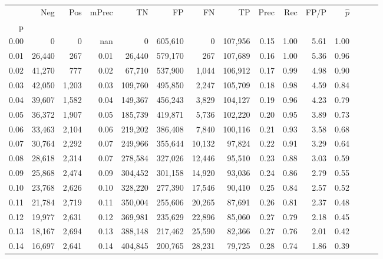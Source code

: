 \begin{tabular}{rrrrrrrrrrrrrrr}
\toprule
{} &     Neg &    Pos & mPrec &       TN &       FP &       FN &       TP &  Prec &   Rec &  FP/P & $\hat{p}$ \\
p    &         &        &       &          &          &          &          &       &       &       &           \\
\midrule
0.00 &       0 &      0 &   nan &        0 &  605,610 &        0 &  107,956 &  0.15 &  1.00 &  5.61 &      1.00 \\
0.01 &  26,440 &    267 &  0.01 &   26,440 &  579,170 &      267 &  107,689 &  0.16 &  1.00 &  5.36 &      0.96 \\
0.02 &  41,270 &    777 &  0.02 &   67,710 &  537,900 &    1,044 &  106,912 &  0.17 &  0.99 &  4.98 &      0.90 \\
0.03 &  42,050 &  1,203 &  0.03 &  109,760 &  495,850 &    2,247 &  105,709 &  0.18 &  0.98 &  4.59 &      0.84 \\
0.04 &  39,607 &  1,582 &  0.04 &  149,367 &  456,243 &    3,829 &  104,127 &  0.19 &  0.96 &  4.23 &      0.79 \\
0.05 &  36,372 &  1,907 &  0.05 &  185,739 &  419,871 &    5,736 &  102,220 &  0.20 &  0.95 &  3.89 &      0.73 \\
0.06 &  33,463 &  2,104 &  0.06 &  219,202 &  386,408 &    7,840 &  100,116 &  0.21 &  0.93 &  3.58 &      0.68 \\
0.07 &  30,764 &  2,292 &  0.07 &  249,966 &  355,644 &   10,132 &   97,824 &  0.22 &  0.91 &  3.29 &      0.64 \\
0.08 &  28,618 &  2,314 &  0.07 &  278,584 &  327,026 &   12,446 &   95,510 &  0.23 &  0.88 &  3.03 &      0.59 \\
0.09 &  25,868 &  2,474 &  0.09 &  304,452 &  301,158 &   14,920 &   93,036 &  0.24 &  0.86 &  2.79 &      0.55 \\
0.10 &  23,768 &  2,626 &  0.10 &  328,220 &  277,390 &   17,546 &   90,410 &  0.25 &  0.84 &  2.57 &      0.52 \\
0.11 &  21,784 &  2,719 &  0.11 &  350,004 &  255,606 &   20,265 &   87,691 &  0.26 &  0.81 &  2.37 &      0.48 \\
0.12 &  19,977 &  2,631 &  0.12 &  369,981 &  235,629 &   22,896 &   85,060 &  0.27 &  0.79 &  2.18 &      0.45 \\
0.13 &  18,167 &  2,694 &  0.13 &  388,148 &  217,462 &   25,590 &   82,366 &  0.27 &  0.76 &  2.01 &      0.42 \\
0.14 &  16,697 &  2,641 &  0.14 &  404,845 &  200,765 &   28,231 &   79,725 &  0.28 &  0.74 &  1.86 &      0.39 \\

\end{tabular}
